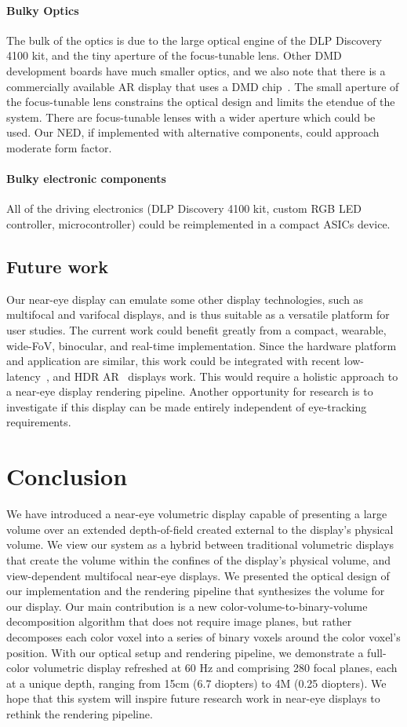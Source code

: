 \paragraph{Bulky Optics}
The bulk of the optics is due to the large optical engine of the DLP Discovery 4100 kit, and the tiny aperture of the focus-tunable lens. Other DMD development boards have much smaller optics, and we also note that there is a commercially available AR display that uses a DMD chip~\cite{Dewald2016Avegant}. The small aperture of the focus-tunable lens constrains the optical design and limits the etendue of the system. There are focus-tunable lenses with a wider aperture which could be used. Our NED, if implemented with alternative components, could approach moderate form factor.

\paragraph{Bulky electronic components}
All of the driving electronics (DLP Discovery 4100 kit, custom RGB LED controller, microcontroller) could be reimplemented in a compact ASICs device. 

\subsection{Future work}
Our near-eye display can emulate some other display technologies, such as multifocal and varifocal displays, and is thus suitable as a versatile platform for user studies. The current work could benefit greatly from a compact, wearable, wide-FoV, binocular, and real-time implementation. Since the hardware platform and application are similar, this work could be integrated with recent low-latency~\cite{Lincoln2016motion}, and HDR AR~\cite{Lincoln2017scene} displays work. This would require a holistic approach to a near-eye display rendering pipeline. Another opportunity for research is to investigate if this display can be made entirely independent of eye-tracking requirements.

\section{Conclusion}
We have introduced a near-eye volumetric display capable of presenting a large volume over an extended depth-of-field created external to the display's physical volume. We view our system as a hybrid between traditional volumetric displays that create the volume within the confines of the display's physical volume, and view-dependent multifocal near-eye displays. We presented the optical design of our implementation and the rendering pipeline that synthesizes the volume for our display. Our main contribution is a new color-volume-to-binary-volume decomposition algorithm that does not require image planes, but rather decomposes each color voxel into a series of binary voxels around the color voxel's position. With our optical setup and rendering pipeline, we demonstrate a full-color volumetric display refreshed at 60 Hz and comprising 280 focal planes, each at a unique depth, ranging from 15cm (6.7 diopters) to 4M (0.25 diopters). We hope that this system will inspire future research work in near-eye displays to rethink the rendering pipeline. 
